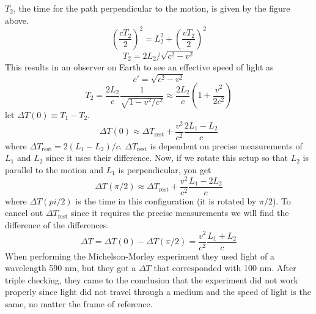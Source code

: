         $T_2$, the time for the path perpendicular to the motion, is given by the figure above.
        \begin{equation*}
            (\frac{cT_2}{2})^2 = L_2^2 + (\frac{vT_2}{2})^2
        \end{equation*}
        \begin{equation*}
            T_2 = 2L_2 / \sqrt{c^2 - v^2}
        \end{equation*}
        This results in an observer on Earth to see an effective speed of light as $$c' = \sqrt{c^2 - v^2}$$
        \begin{equation*}
            T_2 = \frac{2L_2}{c}\frac{1}{\sqrt{1 - v^2/c^2}} \approx \frac{2L_2}{c}(1 + \frac{v^2}{2c^2})
        \end{equation*}
        let $\Delta T(0) \equiv T_1 - T_2$.
        \begin{equation*}
            \Delta T(0) \approx \Delta T_{\text{rest}} + \frac{v^2}{c^2}\frac{2L_1-L_2}{c}
        \end{equation*}
        where $\Delta T_{\text{rest}} = 2(L_1 - L_2) / c$. $\Delta T_{\text{rest}}$ is dependent on precise measurements of $L_1$ and $L_2$ since it uses their difference.
        \newline \indent
        Now, if we rotate this setup so that $L_2$ is parallel to the motion and $L_1$ is perpendicular, you get
        \begin{equation*}
            \Delta T(\pi / 2) \approx \Delta T_{\text{rest}} + \frac{v^2}{c^2}\frac{L_1 - 2L_2}{c}
        \end{equation*}
        where $\Delta T(pi / 2)$ is the time in this configuration (it is rotated by $\pi /  2$). To cancel out $\Delta T_{\text{rest}}$ since it requires the precise measurements we will find the difference of the differences.
        \begin{equation*}
            \Delta T = \Delta T(0) - \Delta T(\pi / 2) = \frac{v^2}{c^2}\frac{L_1 + L_2}{c}
        \end{equation*}
        When performing the Michelson-Morley experiment they used light of a wavelength 590 nm, but they got a $\Delta T$ that corresponded with 100 nm.
        \newline \indent
        After triple checking, they came to the conclusion that the experiment did not work properly since light did not travel through a medium and the speed of light is the same, no matter the frame of reference.

